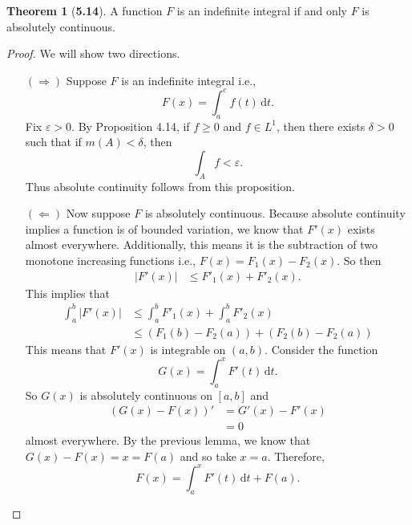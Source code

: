 \documentclass[12pt]{article}
\newcommand{\dif}{\, \mathrm{d}}
\renewcommand{\epsilon}{\varepsilon}
\theoremstyle{definition}
\newtheorem*{thm}{Theorem}
\begin{document}
\begin{thm}[\textbf{5.14}]

    A function \( F \) is an indefinite integral if and only \( F \) is absolutely continuous. 
    \begin{proof}
        We will show two directions. 
        \begin{enumerate}
            \item[\((\Rightarrow)\)] Suppose \( F \) is an indefinite integral i.e.,
                \[
                    F(x) = \int_{a}^{c} f(t) \dif t.  
                \]
            Fix \( \epsilon > 0 \).
            By Proposition 4.14, if \( f \geq 0 \) and \( f \in L^1 \), then there exists \( \delta > 0 \) such that if \( m(A) < \delta \), then 
                \[
                    \int_{A} f < \epsilon.  
                \]
            Thus absolute continuity follows from this proposition. 
            \item[\((\Leftarrow)\)] Now suppose \( F \) is absolutely continuous. Because absolute continuity implies a function is of bounded variation,
            we know that \( F'(x) \) exists almost everywhere. 
            Additionally, this means it is the subtraction of two monotone increasing functions i.e., \( F(x) = F_1(x) - F_2(x) \).
            So then 
                \begin{align*}
                    |F'(x)| &\leq F'_1(x) + F'_2(x).
                \end{align*}
            This implies that
                \begin{align*}
                    \int_{a}^{b} |F'(x)| &\leq \int_{a}^{b} F'_{1}(x) + \int_{a}^{b} F'_{2}(x) \\
                    &\leq \left( F_{1}(b) - F_{2}(a) \right) + \left( F_{2}(b) - F_{2}(a) \right)
                \end{align*}
            This means that \( F'(x) \) is integrable on \( (a,b) \). 
            Consider the function 
                \[ 
                    G(x) = \int_{a}^{x} F'(t) \dif t.
                \]
            So \( G(x) \) is absolutely continuous on \( [a,b] \) and 
                \begin{align*}
                    \left(G(x) - F(x) \right)' &= G'(x) - F'(x) \\
                    &= 0 
                \end{align*}
            almost everywhere. By the previous lemma, we know that \( G(x) - F(x) = x = F(a) \) and so take \( x = a \). Therefore, 
                \[  
                    F(x) = \int_{a}^{x} F'(t) \dif t + F(a).    
                \]
        \end{enumerate}
    \end{proof}
\end{thm}
\end{document}
